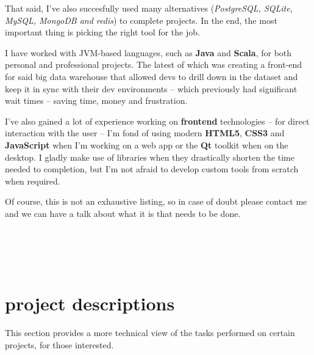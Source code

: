 \documentclass[]{friggeri-cv}
\begin{document}
That said, I've also succesfully used many alternatives (\emph{PostgreSQL, SQLite, MySQL, MongoDB and redis}) to complete projects. In the end, the most important thing is picking the right tool for the job.

I have worked with JVM-based languages, such as \textbf{Java} and \textbf{Scala}, for both personal and professional projects. The latest of which was creating a front-end for said big data warehouse that allowed devs to drill down in the dataset and keep it in sync with their dev environments -- which previously had significant wait times -- saving time, money and frustration.

I've also gained a lot of experience working on \textbf{frontend} technologies -- for direct interaction with the user -- I'm fond of using modern \textbf{HTML5}, \textbf{CSS3} and \textbf{JavaScript} when I'm working on a web app or the \textbf{Qt} toolkit when on the desktop. I gladly make use of libraries when they drastically shorten the time needed to completion, but I'm not afraid to develop custom tools from scratch when required.

Of course, this is not an exhaustive listing, so in case of doubt please contact me and we can have a talk about what it is that needs to be done. \\\\\\\\\\

\section{project descriptions}

This section provides a more technical view of the tasks performed on certain projects, for those interested.
\end{document}
